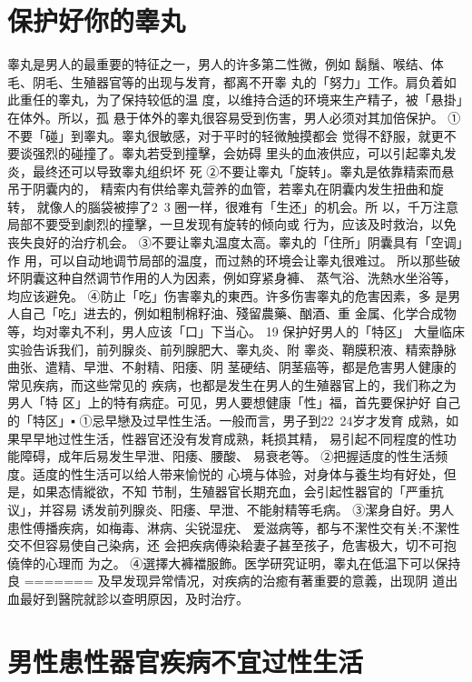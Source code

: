 \documentclass[12pt,UTF8]{ctexbook}
\begin{document}
\section{保护好你的睾丸}
睾丸是男人的最重要的特征之一，男人的许多第二性微，例如
鬍鬚、喉结、体毛、阴毛、生殖器官等的出现与发育，都离不开睾
丸的「努力」工作。肩负着如此重任的睾丸，为了保持较低的温
度，以维持合适的环境来生产精子，被「悬掛」在体外。所以，孤
悬于体外的睾丸很容易受到伤害，男人必须对其加倍保护。
①不要「碰」到睾丸。睾丸很敏感，对于平时的轻微触摸都会
觉得不舒服，就更不要谈强烈的碰撞了。睾丸若受到撞擊，会妨碍
里头的血液供应，可以引起睾丸发炎，最终还可以导致睾丸组织坏
死
②不要让睾丸「旋转」。睾丸是依靠精索而悬吊于阴囊内的，
精索内有供给睾丸营养的血管，若睾丸在阴囊内发生扭曲和旋转，
就像人的腦袋被擰了2~3 圈一样，很难有「生还」的机会。所
以，千万注意局部不要受到劇烈的撞擊，一旦发现有旋转的倾向或
行为，应该及时救治，以免丧失良好的治疗机会。
③不要让睾丸温度太高。睾丸的「住所」阴囊具有「空调」作
用，可以自动地调节局部的温度，而过熱的环境会让睾丸很难过。
所以那些破坏阴囊这种自然调节作用的人为因素，例如穿紧身褲、
蒸气浴、洗熱水坐浴等，均应该避免。
④防止「吃」伤害睾丸的東西。许多伤害睾丸的危害因素，多
是男人自己「吃」进去的，例如粗制棉籽油、殘留農藥、酗酒、重
金属、化学合成物等，均对睾丸不利，男人应该「口」下当心。
19 保护好男人的「特区」
大量临床实验告诉我们，前列腺炎、前列腺肥大、睾丸炎、附
睾炎、鞘膜积液、精索静脉曲张、遣精、早泄、不射精、阳痿、阴
茎硬结、阴茎癌等，都是危害男人健康的常见疾病，而这些常见的
疾病，也都是发生在男人的生殖器官上的，我们称之为男人「特
区」上的特有病症。可见，男人要想健康「性」福，首先要保护好
自己的「特区」▪
①忌早戀及过早性生活。一般而言，男子到22~24岁才发育
成熟，如果早早地过性生活，性器官还没有发育成熟，耗损其精，
易引起不同程度的性功能障碍，成年后易发生早泄、阳痿、腰酸、
易衰老等。
②把握适度的性生活频度。适度的性生活可以给人带来愉悦的
心境与体验，对身体与養生均有好处，但是，如果态情縱欲，不知
节制，生殖器官长期充血，会引起性器官的「严重抗议」，并容易
诱发前列腺炎、阳痿、早泄、不能射精等毛病。
③潔身自好。男人患性傅播疾病，如梅毒、淋病、尖锐湿疣、
爱滋病等，都与不潔性交有关;不潔性交不但容易使自己染病，还
会把疾病傅染耠妻子甚至孩子，危害极大，切不可抱僥倖的心理而
为之。
④選擇大褲襠服飾。医学研究证明，睾丸在低温下可以保持良
=======
及早发现异常情况，对疾病的治癒有著重要的意義，出现阴
道出血最好到醫院就診以查明原因，及时治疗。

\section{男性患性器官疾病不宜过性生活}
\end{document}
